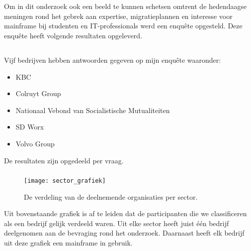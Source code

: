 
 \section{}
 \label{sec:De resultaten van de bevraging}
 
 Om in dit onderzoek ook een beeld te kunnen schetsen omtrent de hedendaagse meningen rond het gebrek aan expertise, migratieplannen en interesse voor mainframe bij studenten en IT-professionals werd een enquête opgesteld. Deze enquête heeft volgende resultaten opgeleverd.
 
  \subsection{}
 \label{sec:De resultaten van de bevraging}

Vijf bedrijven hebben antwoorden gegeven op mijn enquête waaronder: 
 \begin{itemize}
    \item KBC
    \item Colruyt Group
    \item Nationaal Vebond van Socialistische Mutualiteiten
    \item SD Worx
    \item Volvo Group
\end{itemize}

De resultaten zijn opgedeeld per vraag. 

 \subsubsection{}
\label{sec:In welke sector is het bedrijf actief}

 \begin{figure}[h]
    \centering
    \texttt{[image: sector\_grafiek]}
    \caption{De verdeling van de deelnemende organisaties per sector.}
\end{figure}

Uit bovenstaande grafiek is af te leiden dat de participanten die we classificeren als een bedrijf gelijk verdeeld waren. Uit elke sector heeft juist één bedrijf deelgenomen aan de bevraging rond het onderzoek. Daarnaast heeft elk bedrijf uit deze grafiek een mainframe in gebruik. 



